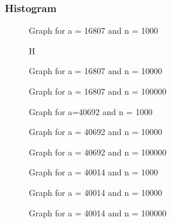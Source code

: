 \documentclass[10pt]{article}
\begin{document}
\subsubsection{Histogram}
	\begin{figure}[H]
       	     	\centering
		\caption{Graph for a = 16807  and  n = 1000}	
		\label{3:q3_f1_a}
	\end{figure}
	\begin{figure}{H}
       	     	\centering
		\caption{Graph for a = 16807  and  n = 10000}	
		\label{3:q3_f1_b}
	\end{figure}
	\begin{figure}[H]
       	     	\centering
		\caption{Graph for a = 16807  and  n = 100000}	
		\label{3:q3_f1_c}
	\end{figure}
	\begin{figure}[H]
       	     	\centering
		\caption{Graph for  a=40692  and  n = 1000}	
		\label{3:q3_f1_a}
	\end{figure}
	\begin{figure}[H]
       	     	\centering
		\caption{Graph for a = 40692  and  n = 10000}	
		\label{3:q3_f1_b}
	\end{figure}
	\begin{figure}[H]
       	     	\centering
		\caption{Graph for a = 40692  and  n =  100000}	
		\label{3:q3_f1_c}
	\end{figure}
	\begin{figure}[H]
       	     	\centering
		\caption{Graph for a = 40014  and  n = 1000}	
		\label{3:q3_f1_a}
	\end{figure}
	\begin{figure}[H]
       	     	\centering
		\caption{Graph for a = 40014  and  n = 10000}	
		\label{3:q3_f1_b}
	\end{figure}
	\begin{figure}[H]
       	     	\centering
		\caption{Graph for a = 40014  and n = 100000}	
		\label{3:q3_f1_c}
	\end{figure}
\end{document}
